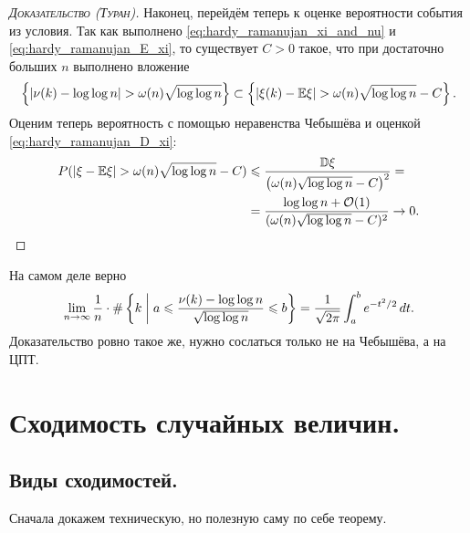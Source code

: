 \documentclass[../main.tex]{subfiles}
\begin{document}
\begin{proof}[\normalfont\textsc{Доказательство (Туран)}]
 Наконец, перейдём теперь к оценке вероятности события из условия. Так как выполнено \eqref{eq:hardy_ramanujan_xi_and_nu}  и \eqref{eq:hardy_ramanujan_E_xi}, то существует $ C > 0 $ такое, что при достаточно больших $ n $ выполнено вложение
 \begin{align*}
  \left\{\left| \nu(k) - \log\log n \right| > \omega(n) \sqrt{\log\log n} \right\} \subset \left\{ \left|\xi(k) - \mathbb E\xi \right| > \omega(n)\sqrt{\log\log n} - C \right\}.
 \end{align*} Оценим теперь вероятность с помощью неравенства Чебышёва и оценкой \eqref{eq:hardy_ramanujan_D_xi}:
 \begin{align*}
  P( \left| \xi - \mathbb E\xi \right| > \omega(n)\sqrt{\log\log n} - C) &\leqslant \frac{\mathbb D\xi}{\left( \omega(n)\sqrt{\log \log n} - C \right)^{2}} = \\
  &= \frac{\log\log n + \mathcal{O}(1)}{(\omega(n)\sqrt{\log \log n} - C)^{2}} \to 0.
 \end{align*} 
\end{proof}
\begin{remrk}
 На самом деле верно
 \begin{align*}
  \lim_{n \to \infty} \frac{1}{n} \cdot \# \left\{ k \;\middle|\; a \leqslant \frac{\nu(k)- \log\log n}{\sqrt{\log \log n}} \leqslant b \right\} = \frac{1}{\sqrt{2\pi}} \int_{a}^{b} e^{-t^{2} / 2}\,dt.
 \end{align*} Доказательство ровно такое же, нужно сослаться только не на Чебышёва, а на ЦПТ.
\end{remrk}

\newpage
\section{Сходимость случайных величин.}

\subsection{Виды сходимостей.}

Сначала докажем техническую, но полезную саму по себе теорему.
\end{document}
